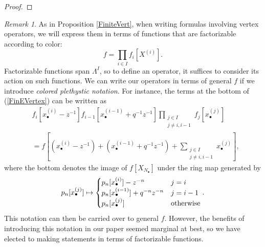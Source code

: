 \documentclass{amsart}
\theoremstyle{remark}
\newtheorem{rem}[thm]{Remark}
\numberwithin{thm}{section}
\numberwithin{equation}{section}
\begin{document}
\begin{proof}
%
\end{proof}

\begin{rem}
    As in Proposition \ref{FiniteVert}, when writing formulas involving vertex operators, we will express them in terms of
    functions that are factorizable according to color:
    \[
    f=\prod_{i\in I}f_i[X^{(i)}].
    \]
    Factorizable functions span $\Lambda^I$, so to define an operator, it suffices to consider its action on such functions.
    We can write our operators in terms of general $f$ if we introduce \textit{colored plethystic notation}.
    For instance, the terms at the bottom of (\ref{FinEVertex}) can be written as
    \begin{align*}
        &f_i\left[x_{\bullet}^{(i)}-z^{-1}\right]f_{i-1}\left[x_{\bullet}^{(i-1)}+q^{-1}z^{-1}\right]
    \prod_{\substack{j\in I\\j\not=i,i-1}} f_j\left[x_{\bullet}^{(j)}\right]\\
        &=f\left[\left(x_\bullet^{(i)}-z^{-1}\right)+\left(x_\bullet^{(i-1)}+q^{-1}z^{-1}\right)+\sum_{\substack{j\in I\\j\not=i,i-1}}x_\bullet^{(j)}\right],
    \end{align*}
    where the bottom denotes the image of $f[X_{N_\bullet}]$ under the ring map generated by
    \[
    p_n[x_\bullet^{(j)}]\mapsto
    \begin{cases}
        p_n[x_\bullet^{(i)}]-z^{-n} & j=i\\
        p_n[x_\bullet^{(i-1)}]+q^{-n}z^{-n} & j=i-1\\
        p_n[x_\bullet^{(j)}] & \hbox{otherwise}
    \end{cases}.
    \]
    This notation can then be carried over to general $f$.
    However, the benefits of introducing this notation in our paper seemed marginal at best, so we have elected to making statements in terms of factorizable functions.
\end{rem}
\end{document}
